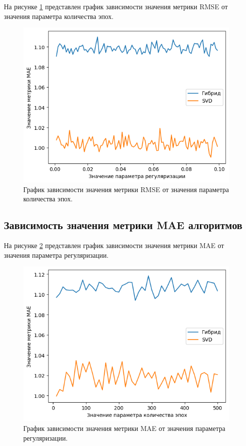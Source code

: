 На рисунке \ref{img:2} представлен график зависимости значения метрики RMSE от значения параметра количества эпох.

\begin{figure}[H]
	\centering
	\includegraphics[width=\textwidth]{inc/2.png}
	\caption{ График зависимости значения метрики RMSE от значения параметра количества эпох.}
	\label{img:2}
\end{figure}

\subsection{Зависимость значения метрики MAE алгоритмов}

На рисунке \ref{img:3} представлен график зависимости значения метрики MAE от значения параметра регуляризации.

\begin{figure}[H]
	\centering
	\includegraphics[width=\textwidth]{inc/3.png}
	\caption{ График зависимости значения метрики MAE от значения параметра регуляризации.}
	\label{img:3}
\end{figure}

